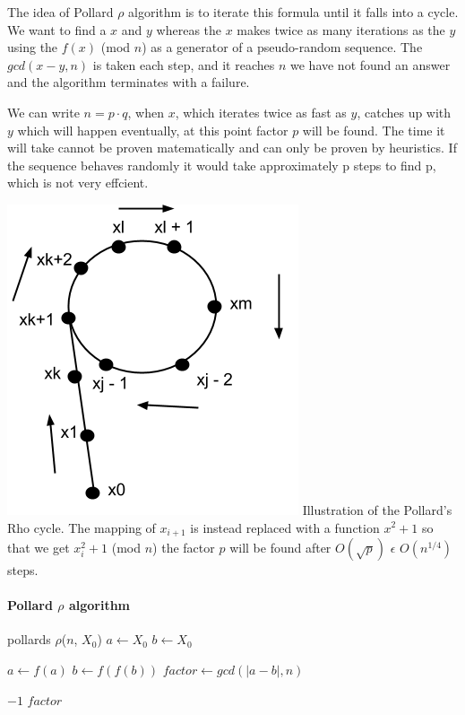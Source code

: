 The idea of Pollard $\rho$ algorithm is to iterate this formula until it falls into a cycle. We want to find a $x$ and $y$ whereas the $x$ makes twice as many iterations as the $y$ using the $f(x)$ (mod $n$) as a generator of a pseudo-random sequence. The $gcd(x - y, n)$ is taken each step, and it reaches $n$ we have not found an answer and the algorithm terminates with a failure.

We can write $n = p \cdot q$, when $x$, which iterates twice as fast as $y$, catches up with $y$ which will happen eventually, at this point factor $p$ will be found. The time it will take cannot be proven matematically and can only be proven by heuristics. If the sequence behaves randomly it would take approximately p steps to find p, which is not very effcient. \cite{avalg} 


\includegraphics[scale = 0.5]{pollards.png}
Illustration of the Pollard's Rho cycle. The mapping of $x_{i+1}$ is instead replaced with a function $x^2+1$ so that we get $x^2_{i}+1$  (mod $n$) the factor $p$ will be found after $O(\sqrt{p})$  $\epsilon$ $O(n^{1/4})$ steps. \cite{avalg}

\paragraph{Pollard $\rho$ algorithm}
\begin{algorithmic}
    \STATE pollards $\rho$($n$, $X_0$)
        \STATE $a \gets X_0 $
        \STATE $b \gets X_0 $

            \STATE $a \gets f(a)$
            \STATE $b \gets f(f(b))$
            \STATE $factor \gets gcd(|a-b|, n)$
        \ENDWHILE

            \STATE {}
            \RETURN $-1$ 
            \RETURN $factor$
        \ENDIF
\end{algorithmic}


